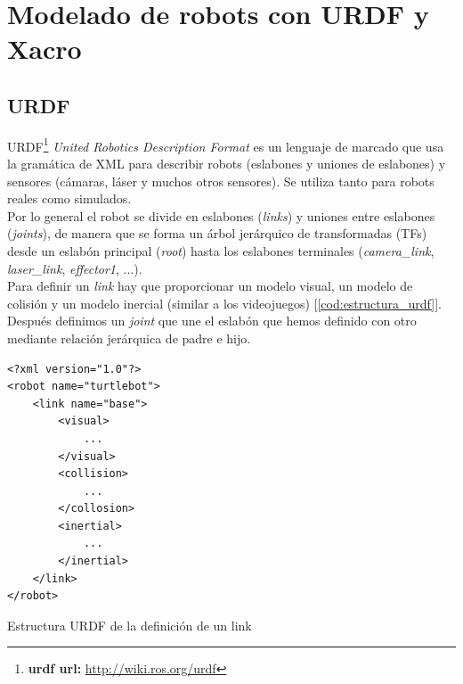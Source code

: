\section{Modelado de robots con URDF y Xacro}
\label{sec:modelado_urdf_xacro}

\subsection{URDF}
\label{subsec:urdf}

URDF\footnote{\textbf{urdf url:} \url{http://wiki.ros.org/urdf}}  \textit{United Robotics Description Format} es un lenguaje de marcado que usa la gramática de XML para describir robots (eslabones y uniones de eslabones) y sensores (cámaras, láser y muchos otros sensores). Se utiliza tanto para robots reales como simulados.\\

Por lo general el robot se divide en eslabones (\textit{links}) y uniones entre eslabones (\textit{joints}), de manera que se forma un árbol jerárquico de transformadas (TFs) desde un eslabón principal (\textit{root}) hasta los eslabones terminales (\textit{camera\_link}, \textit{laser\_link}, \textit{effector1}, ...).\\

Para definir un \textit{link} hay que proporcionar un modelo visual, un modelo de colisión y un modelo inercial (similar a los videojuegos) [\ref{cod:estructura_urdf}]. Después definimos un \textit{joint} que une el eslabón que hemos definido con otro mediante relación jerárquica de padre e hijo.\\

\begin{code}[H]
\begin{lstlisting}
<?xml version="1.0"?>
<robot name="turtlebot">
	<link name="base">
		<visual>
			...
		</visual>
		<collision>
			...
		</collosion>
		<inertial>
			...
		</inertial>
	</link>
</robot>
\end{lstlisting}
\caption[Estructura URDF de la definicion de un link]{Estructura URDF de la definición de un link}
\label{cod:estructura_urdf}
\end{code}

